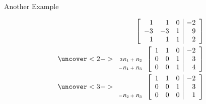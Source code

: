 \begin{frame}{Another Example}

  \begin{eqnarray*}
    \stateThree{~}{~}{~}
    \startRowOps
    \oneRowOps{1}{1}{0}{-2}
    \oneRowOps{-3}{-3}{1}{9}
    \oneRowOps{1}{1}{1}{2}
    \stopRowOps
    \\
    \uncover<2->{%
      \stateThree{~}{3R_1+R_2}{-R_1+R_3}
      \startRowOps
      \oneRowOps{1}{1}{0}{-2}
      \oneRowOps{0}{0}{1}{3}
      \oneRowOps{0}{0}{1}{4}
      \stopRowOps
    }
    \\
    \uncover<3->{%
      \stateThree{~}{~}{-R_2+R_3}
      \startRowOps
      \oneRowOps{1}{1}{0}{-2}
      \oneRowOps{0}{0}{1}{3}
      \oneRowOps{0}{0}{0}{1}
      \stopRowOps
    }
  \end{eqnarray*}

  
\end{frame}



